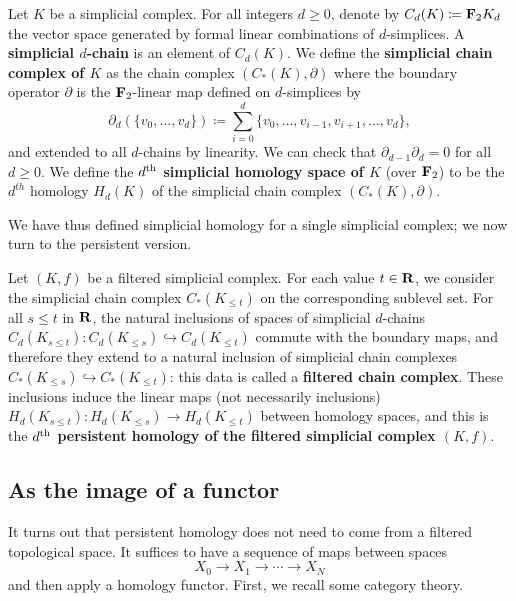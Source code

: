 \begin{definition}
\label{!D:simplicial-homology}
  Let $K$ be a simplicial complex. For all integers $d \geq 0$, denote by $C_d(K) \coloneq \bf{F}_2 K_d$ the vector space generated by formal linear combinations of $d$-simplices. A \textbf{simplicial $d$-chain} is an element of $C_d(K)$. We define the \textbf{simplicial chain complex of $K$} as the chain complex $(C_*(K), \partial)$ where the boundary operator $\partial$ is the $\bf{F}_2$-linear map defined on $d$-simplices by
  \[
    \partial_d(\{v_0, \ldots, v_d\}) \coloneq \sum_{i = 0}^d \{v_0, \ldots, v_{i - 1}, v_{i + 1}, \ldots, v_d\},
  \]
  and extended to all $d$-chains by linearity. We can check that $\partial_{d - 1} \partial_d = 0$ for all $d \geq 0$. We define the \textbf{$d^{\th}$ simplicial homology space of $K$} (over $\bf{F}_2$) to be the $d^{th}$ homology $H_d(K)$ of the simplicial chain complex $(C_*(K), \partial)$.
\end{definition}

We have thus defined simplicial homology for a single simplicial complex; we now turn to the persistent version.

\begin{definition}
\label{!D:filtered-chain-complex}
  Let $(K, f)$ be a filtered simplicial complex. For each value $t \in \R$, we consider the simplicial chain complex $C_*(K_{\leq t})$ on the corresponding sublevel set. For all $s \leq t$ in $\R$, the natural inclusions of spaces of simplicial $d$-chains $C_d(K_{s \leq t}) \colon C_d(K_{\leq s}) \hookrightarrow C_d(K_{\leq t})$ commute with the boundary maps, and therefore they extend to a natural inclusion of simplicial chain complexes $C_*(K_{\leq s}) \hookrightarrow C_*(K_{\leq t})$: this data is called a \textbf{filtered chain complex}. These inclusions induce the linear maps (not necessarily inclusions) $H_d(K_{s \leq t}) \colon H_d(K_{\leq s}) \to H_d(K_{\leq t})$ between homology spaces, and this is the \textbf{$d^{\th}$ persistent homology of the filtered simplicial complex $(K, f)$}.
\end{definition}

\subsection{As the image of a functor}

It turns out that persistent homology does not need to come from a filtered topological space. It suffices to have a sequence of maps between spaces
\[
X_0 \to X_1 \to \cdots \to X_N
\]
and then apply a homology functor. First, we recall some category theory.

